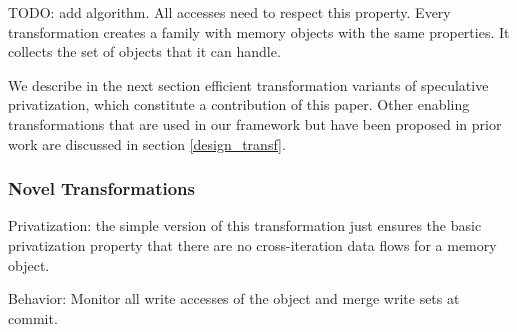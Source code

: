 TODO: add algorithm. All accesses need to respect this property. Every
transformation creates a family with memory objects with the same
properties.  It collects the set of objects that it can handle.


We describe in the next section efficient transformation variants of
speculative privatization, which constitute a contribution of this
paper.  Other enabling transformations that are used in our framework
but have been proposed in prior work are discussed in
section \ref{design_transf}.

\subsubsection{Novel Transformations}
\label{novel_transf}

%

Privatization: the simple version of this transformation just
ensures the basic privatization property that there are no
cross-iteration data flows for a memory object.

Behavior: Monitor all write accesses of the object and merge write
sets at commit.

